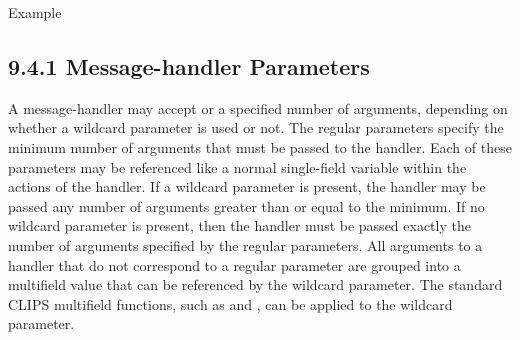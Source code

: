 \documentclass[letterpaper,10pt,english]{sphinxmanual}
\begin{document}
Example

\begin{sphinxVerbatim}[commandchars=\\\{\}]
 
    
    
     
    
    
  
    
  \PYG{p}{[}\PYG{p}{]}  
\PYG{p}{[}\PYG{p}{]}
  \PYG{p}{[}\PYG{p}{]} 
      
  \PYG{p}{[}\PYG{p}{]}  
     
  
\end{sphinxVerbatim}


\subsection{9.4.1 Message-handler Parameters}
\label{\detokenize{cool:message-handler-parameters}}
A message-handler may accept  or  a specified number
of arguments, depending on whether a wildcard parameter is used or not.
The regular parameters specify the minimum number of arguments that must
be passed to the handler. Each of these parameters may be referenced
like a normal single-field variable within the actions of the handler.
If a wildcard parameter is present, the handler may be passed any number
of arguments greater than or equal to the minimum. If no wildcard
parameter is present, then the handler must be passed exactly the number
of arguments specified by the regular parameters. All arguments to a
handler that do not correspond to a regular parameter are grouped into a
multifield value that can be referenced by the wildcard parameter. The
standard CLIPS multifield functions, such as  and
, can be applied to the wildcard parameter.
\end{document}
